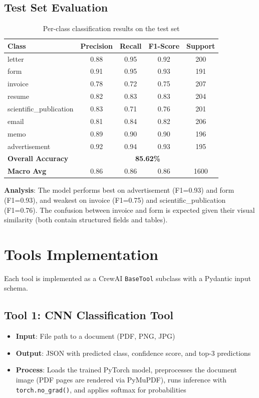 \documentclass[12pt,a4paper]{article}
\begin{document}
\subsection{Test Set Evaluation}

\begin{table}[H]
\centering
\caption{Per-class classification results on the test set}
\begin{tabular}{@{}lcccc@{}}
\toprule
\textbf{Class} & \textbf{Precision} & \textbf{Recall} & \textbf{F1-Score} & \textbf{Support} \\
\midrule
letter & 0.88 & 0.95 & 0.92 & 200 \\
form & 0.91 & 0.95 & 0.93 & 191 \\
invoice & 0.78 & 0.72 & 0.75 & 207 \\
resume & 0.82 & 0.83 & 0.83 & 204 \\
scientific\_publication & 0.83 & 0.71 & 0.76 & 201 \\
email & 0.81 & 0.84 & 0.82 & 206 \\
memo & 0.89 & 0.90 & 0.90 & 196 \\
advertisement & 0.92 & 0.94 & 0.93 & 195 \\
\midrule
\textbf{Overall Accuracy} & \multicolumn{4}{c}{\textbf{85.62\%}} \\
\textbf{Macro Avg} & 0.86 & 0.86 & 0.86 & 1600 \\
\bottomrule
\end{tabular}
\end{table}

\textbf{Analysis}: The model performs best on advertisement (F1=0.93) and form (F1=0.93), and weakest on invoice (F1=0.75) and scientific\_publication (F1=0.76). The confusion between invoice and form is expected given their visual similarity (both contain structured fields and tables).

\section{Tools Implementation}

Each tool is implemented as a CrewAI \texttt{BaseTool} subclass with a Pydantic input schema.

\subsection{Tool 1: CNN Classification Tool}
\begin{itemize}
    \item \textbf{Input}: File path to a document (PDF, PNG, JPG)
    \item \textbf{Output}: JSON with predicted class, confidence score, and top-3 predictions
    \item \textbf{Process}: Loads the trained PyTorch model, preprocesses the document image (PDF pages are rendered via PyMuPDF), runs inference with \texttt{torch.no\_grad()}, and applies softmax for probabilities
\end{itemize}
\end{document}
